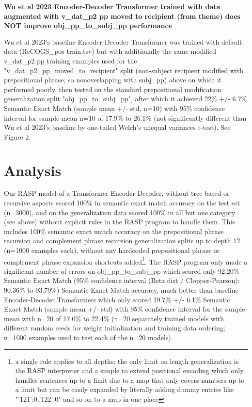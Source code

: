 \documentclass[11pt]{article}
\begin{document}
\textbf{Wu et al 2023 Encoder-Decoder Transformer trained with data augmented with v\_dat\_p2 pp moved to recipient (from theme) does NOT improve obj\_pp\_to\_subj\_pp performance}

Wu et al 2023's baseline Encoder-Decoder Transformer was trained with default data (ReCOGS\_pos train.tsv) but with additionally the same modified v\_dat\_p2 pp training examples used for the "v\_dat\_p2\_pp\_moved\_to\_recipient" split (non-subject recipient modified with prepositional phrase, so nonoverlapping with subj\_pp) above on which it performed poorly, then tested on the standard prepositional modification generalization split "obj\_pp\_to\_subj\_pp", after which it achieved 22\% +/- 6.7\% Semantic Exact Match (sample mean +/- std, n=10) with 95\% confidence interval for sample mean n=10 of 17.9\% to 26.1\% (not significantly different than Wu et al 2023's baseline by one-tailed Welch's unequal variances t-test). See Figure 2.

\section{Analysis} 
Our RASP model of a Transformer Encoder Decoder, without tree-based or recursive aspects scored 100\% in semantic exact match accuracy on the \cite{Wu2023} test set (n=3000), and on the generalization data scored 100\% in all but one category (see above) without explicit rules in the RASP program to handle them. This includes 100\% semantic exact match accuracy on the prepositional phrase recursion and complement phrase recursion generalization splits up to depth 12 (n=1000 examples each), without any hardcoded prepositional phrase or complement phrase expansion shortcuts added\footnote{a single rule applies to all depths; the only limit on length generalization is the RASP interpreter and a simple to extend positional encoding which only handles sentences up to a limit due to a map that only covers numbers up to a limit but can be easily expanded by literally adding dummy entries like "'121':0,'122':0" and so on to a map in one place}. The RASP program only made a significant number of errors on obj\_pp\_to\_subj\_pp which scored only 92.20\% Semantic Exact Match (95\% confidence interval (Beta dist / Clopper-Pearson): 90.36\% to 93.79\%) Semantic Exact Match accuracy, much better than \cite{Wu2023} baseline Encoder-Decoder Transformers which only scored 19.7\% +/- 6.1\% Semantic Exact Match (sample mean +/- std) with 95\% confidence interval for the sample mean with n=20 of 17.0\% to 22.4\% (n=20 separately trained models with different random seeds for weight initialization and training data ordering; n=1000 examples used to test each of the n=20 models).
\end{document}
